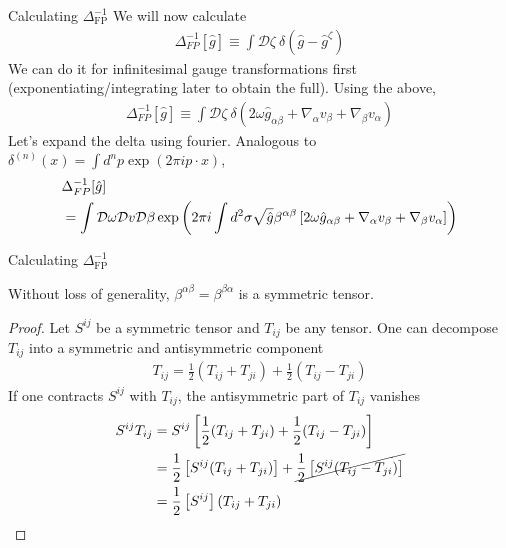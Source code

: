 \documentclass{beamer}
\newcommand{\sqbr}[1]{\ensuremath{\left[#1\right]}}
\def\f#1/#2.{\frac{#1}{#2}}
\begin{document}
\begin{frame}{Calculating $\Delta_{\text{FP}}^{-1}$}
    We will now calculate 
    \begin{align}
        \Delta_{F P}^{-1}[\hat{g}] \equiv \int \mathcal{D} \zeta\ \delta\left(\hat{g}-\hat{g}^\zeta\right)
    \end{align}
    We can do it for infinitesimal gauge transformations first (exponentiating/integrating later to obtain the full). Using the above,
    \begin{align}
     \Delta_{F P}^{-1}[\hat{g}] \equiv \int \mathcal{D} \zeta\ \delta\left( 2 \omega \hat{g}_{\alpha \beta}+\nabla_\alpha v_\beta+\nabla_\beta v_\alpha \right)
    \end{align}
    Let's expand the delta using fourier. Analogous to $\delta^{(n)}(x) = \int d^n p \exp(2\pi i p\cdot x)$,
    \begin{align}
        &\Delta_{F P}^{-1}[\hat{g}]\\
        &=\int \mathcal{D} \omega \mathcal{D} v \mathcal{D} \beta \exp \left(2 \pi i \int d^2 \sigma \sqrt{\hat{g}} \beta^{\alpha \beta}\left[2 \omega \hat{g}_{\alpha \beta}+\nabla_\alpha v_\beta+\nabla_\beta v_\alpha\right]\right) \notag
    \end{align}
\end{frame}
\begin{frame}{Calculating $\Delta_{\text{FP}}^{-1}$}
    \begin{claim} Without loss of generality, $\beta^{\alpha\beta} = \beta^{\beta\alpha}$ is a symmetric tensor.
    \end{claim}
    \begin{proof}
    Let $S^{ij}$ be a symmetric tensor and $T_{ij}$ be any tensor. One can decompose $T_{ij}$ into a symmetric and antisymmetric component 
    \begin{align}
        T_{ij} = \frac{1}{2} (T_{ij} + T_{ji}) + \frac{1}{2} (T_{ij} - T_{ji})
    \end{align}
    If one contracts $S^{ij}$ with $T_{ij}$, the antisymmetric part of $T_{ij}$ vanishes
    \begin{align}
        S^{ij} T_{ij} & = S^{ij} \left[ \frac{1}{2} (T_{ij} + T_{ji}) + \frac{1}{2} (T_{ij} - T_{ji}) \right] \\
        &= \f1/2. \sqbr{S^{ij} (T_{ij} + T_{ji})} + \cancel{\f1/2. \sqbr{S^{ij} (T_{ij} - T_{ji})}} \\
        &= \f1/2. \sqbr{S^{ij}} (T_{ij} + T_{ji})
    \end{align}
    \end{proof}
\end{frame}
\end{document}
